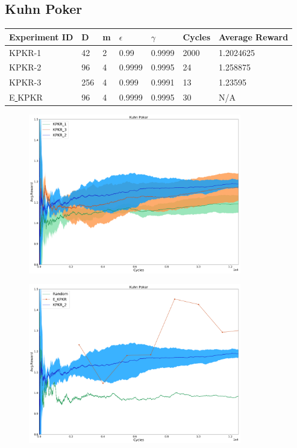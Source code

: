 \documentclass{article}
\theoremstyle{definition}
\newtheorem{primary statistics}[definition]{Primary Statistics}
\newtheorem{auxiliary statistics}[definition]{Auxiliary Statistics}
\begin{document}
\newpage

\subsection{Kuhn Poker}

\begin{tabular}{|l|l|l|l|l|l|l|}
\hline \centering 
  Experiment ID& D & m & $\epsilon$ & $\gamma$ & Cycles & Average Reward \\ \hline
KPKR-1  & 42        & 2           & 0.99        & 0.9999            & 2000   & 1.2024625        \\ \hline
KPKR-2  & 96        & 4           & 0.9999      & 0.9995            & 24     & 1.258875         \\ \hline
KPKR-3  & 256       & 4           & 0.999       & 0.9991            & 13     & 1.23595         \\ \hline
E\underline{ }KPKR  & 96       & 4           & 0.9999       & 0.9995            & 30     & N/A         \\ \hline
\end{tabular}

 \begin{figure}[h]
 \centering
    \includegraphics[width=9.3cm]{4_Kuhn_Poker}
\end{figure}

 \begin{figure}[h]
 \centering
    \includegraphics[width=9.3cm]{Kuhn_Poker}
\end{figure}
\end{document}
